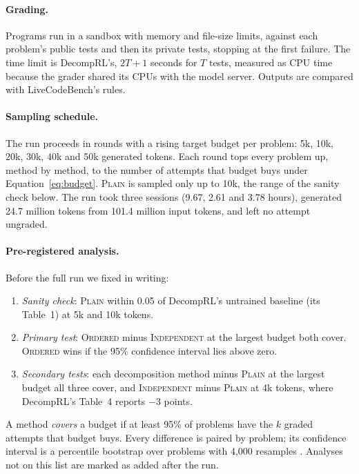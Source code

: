 \documentclass[11pt]{article}
\newcommand{\plain}{\textsc{Plain}}
\newcommand{\indep}{\textsc{Independent}}
\newcommand{\ordered}{\textsc{Ordered}}
\begin{document}
\paragraph{Grading.} Programs run in a sandbox with memory and file-size limits, against each problem's public tests
and then its private tests, stopping at the first failure. The time limit is DecompRL's, $2T + 1$ seconds for $T$
tests, measured as CPU time because the grader shared its CPUs with the model server. Outputs are compared with
LiveCodeBench's rules.

\paragraph{Sampling schedule.} The run proceeds in rounds with a rising target budget per problem: 5k, 10k, 20k, 30k,
40k and 50k generated tokens. Each round tops every problem up, method by method, to the number of attempts that budget
buys under Equation~\eqref{eq:budget}. \plain{} is sampled only up to 10k, the range of the sanity check below. The run took three sessions (9.67, 2.61 and 3.78 hours), generated 24.7 million tokens from 101.4
million input tokens, and left no attempt ungraded.

\paragraph{Pre-registered analysis.} Before the full run we fixed in writing:
\begin{enumerate}[label=(\arabic*)]
  \item \emph{Sanity check}: \plain{} within 0.05 of DecompRL's untrained baseline (its Table~1) at 5k and 10k tokens.
  \item \emph{Primary test}: \ordered{} minus \indep{} at the largest budget both cover. \ordered{} wins if the 95\%
        confidence interval lies above zero.
  \item \emph{Secondary tests}: each decomposition method minus \plain{} at the largest budget all three cover, and
        \indep{} minus \plain{} at 4k tokens, where DecompRL's Table~4 reports $-3$ points.
\end{enumerate}
A method \emph{covers} a budget if at least 95\% of problems have the $k$ graded attempts that budget buys. Every
difference is paired by problem; its confidence interval is a percentile bootstrap over problems with 4,000 resamples
\citep{efron1994bootstrap}. Analyses not on this list are marked as added after the run.
\end{document}
